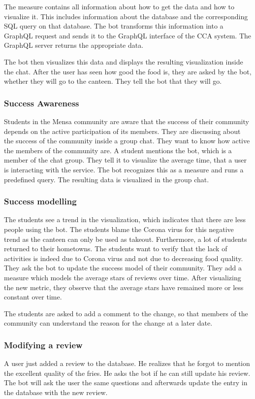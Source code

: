 The measure contains all information about how to get the data and how to visualize it. 
This includes information about the database and the corresponding SQL query on that database. 
The bot transforms this information into a GraphQL request and sends it to the GraphQL interface of the CCA system. 
The GraphQL server returns the appropriate data.

The bot then visualizes this data and displays the  resulting visualization inside the chat.
After the user has seen how good the food is, they are asked by the bot, whether they will go to the canteen. They tell the bot that they will go.

\subsubsection{Success Awareness} Students in the Mensa community are aware that the success of their community depends on the active participation of its members. They are discussing about the success of the community inside a group chat. They want to know how active the members of the community are. A student mentions the bot, which is a member of the chat group. They tell it to visualize the average time, that a user is interacting with the service. The bot recognizes this as a measure and runs a predefined query. The resulting data is visualized in the group chat.

\subsubsection{Success modelling} The students see a trend in the visualization, which indicates that there are less people using the bot.
The students blame the Corona virus for this negative trend as the canteen can only be used as takeout. Furthermore, a lot of students returned to their hometowns.
The students want to verify that the lack of activities is indeed due to Corona virus and not due to decreasing food quality.
They ask the bot to update the success model of their community.
They add a measure which models the average stars of reviews over time.
After visualizing the new metric, they observe that the average stars have remained more or less constant over time.

The students are asked to add a comment to the change, so that members of the community can understand the reason for the change at a later date.


\subsubsection{Modifying a review} A user just added a review to the database. He realizes that he forgot to mention the excellent quality of the fries. 
He asks the bot if he can still update his review. 
The bot will ask the user the same questions and afterwards update the entry in the database with the new review.

